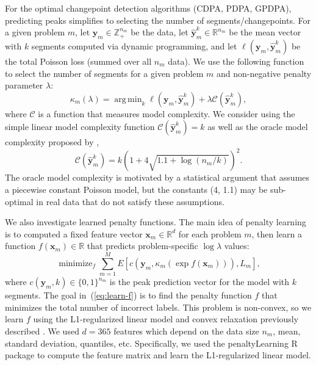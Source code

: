 \documentclass[twoside,11pt]{article}
\DeclareMathOperator*{\argmin}{arg\,min}
\DeclareMathOperator*{\minimize}{minimize}
\newcommand{\ZZ}{\mathbb Z}
\newcommand{\RR}{\mathbb R}
\begin{document}
For the optimal changepoint detection algorithms (CDPA, PDPA, GPDPA),
predicting peaks simplifies to selecting the number of
segments/changepoints. For a given problem $m$, let
$\mathbf y_m\in\ZZ_+^{n_m}$ be the data, let
$\mathbf{\hat y}_m^k\in\RR^{n_m}$ be the mean vector with $k$
segments computed via dynamic programming, and let $\ell(\mathbf y_m, \mathbf{\hat y}^k_m)$ be the
total Poisson loss (summed over all $n_m$ data). We use the following
function to select the number of segments for a given
problem $m$ and non-negative penalty parameter $\lambda$:
\begin{equation}
  \kappa_m(\lambda)=\argmin_{k} \ell(\mathbf y_m, \mathbf{\hat y}^k_m)
+ \lambda \mathcal C(\mathbf{\hat y}^k_m),
\end{equation} 
where $\mathcal C$ is a function that measures model complexity. We consider using the simple linear model complexity function $\mathcal C(\mathbf{\hat y}^k_m)=k$ as well as the oracle model complexity
proposed by \citet{cleynen2013segmentation},
\begin{equation}
\label{eq:oracle}
\mathcal C(\mathbf{\hat y}^k_m) =
k\left(
1 + 4\sqrt{1.1 + \log( n_m/k)}
\right)^2.
\end{equation}
The oracle model complexity is motivated by a statistical argument that assumes a piecewise constant Poisson model, but
the constants (4, 1.1) may be sub-optimal in real data that do not satisfy these assumptions. 

We also investigate learned penalty functions.  The main idea of penalty learning \citep{HOCKING-penalties} is to
computed a fixed feature vector $\mathbf x_m\in\RR^d$ for each problem
$m$, then learn a function $f(\mathbf x_m)\in\RR$ that predicts
problem-specific $\log\lambda$ values:
\begin{equation}
  \label{eq:learn-f}
  \minimize_{f}
  \sum_{m=1}^M E\left[
    c(\mathbf y_m, \kappa_m(\exp f(\mathbf x_m))), 
    L_m\right],
\end{equation}
where $c(\mathbf y_m, k)\in\{0,1\}^{n_m}$ is the peak prediction
vector for the model with $k$ segments. The goal in~(\ref{eq:learn-f})
is to find the penalty function $f$ that minimizes the total number of
incorrect labels. This problem is non-convex, so we learn $f$ using
the L1-regularized linear model and convex relaxation previously
described \citep{HOCKING-penalties}. We used $d=365$ features which
depend on the data size $n_m$, mean, standard deviation, quantiles,
etc. Specifically, we used the penaltyLearning R
package to compute the feature matrix and learn the L1-regularized
linear model.
\end{document}
